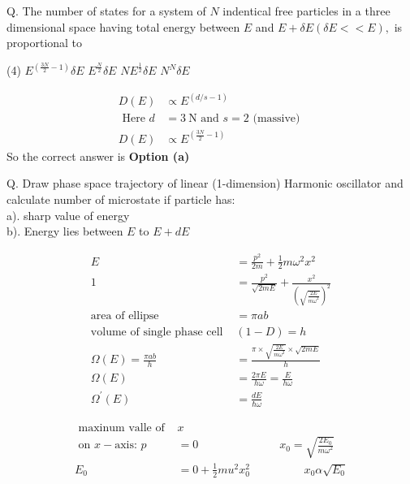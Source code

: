 Q. The number of states for a system of $N$ indentical free particles in a three dimensional space having total energy between $E$ and $E+\delta E(\delta E<<E),$ is proportional to 
 \begin{tasks}(4)
	\task[\textbf{a.}]$E^{\left(\frac{3 N}{2}-1\right)} \delta E$
	\task[\textbf{b.}]$E^{\frac{N}{2}} \delta E$
	\task[\textbf{c.}]$N E^{\frac{1}{2}} \delta E$
	\task[\textbf{d.}]$N^{N} \delta E$ 
\end{tasks}
\begin{answer}
	\begin{align*}
	D(E) &\propto E^{(d / s-1)}\\
	\text { Here } d&=3 \mathrm{~N} \text { and } s=2 \text { (massive) }\\
	D(E) &\propto E^{\left(\frac{3 N}{2}-1\right)}
	\end{align*}
		So the correct answer is \textbf{Option (a)}
\end{answer}
Q. Draw phase space trajectory of linear (1-dimension) Harmonic oscillator and calculate number of microstate if particle has:\\
a). sharp value of energy\\
b). Energy lies between $E$ to $E+d E$
\begin{answer}
	\begin{align*}
	E&=\frac{p^{2}}{2 m}+\frac{1}{2} m \omega^2 x^{2}\\
	1&=\frac{p^{2}}{\sqrt{2 m E}}+\frac{x^{2}}{\left(\sqrt{\frac{2 E}{m \omega^2}}\right)^{2}}\\
	\text{area of ellipse }&=\pi a b\\
	\text{volume of single phase cell }&(1-D)=h\\
	\Omega(E)=\frac{\pi a b}{h}&=\frac{\pi \times \sqrt{\frac{2 E}{m \omega^2}}  \times \sqrt{2 m E}}{h}\\
	\Omega(E)&=\frac{2 \pi E}{h \omega}=\frac{E}{h \omega}\\
	\Omega^{\prime}(E)&=\frac{d E}{\hbar \omega}
	\end{align*}
\end{answer}
\begin{note}
	\begin{align*}
	\text{	maxinum valle of }&x \\
\text{	on }x-\text{axis: }p&=0 \hspace{3cm}x_{0}=\sqrt{\frac{2 E_{0}}{m \omega^{2}}}\\
	E_{0}&=0+\frac{1}{2} m u^{2} x_{0}^{2}\hspace{2cm}x_{0} \alpha \sqrt{E_{0}}\\
	\end{align*}
\end{note}





